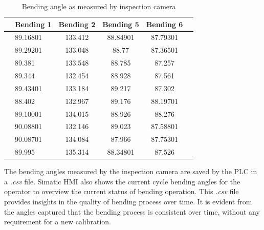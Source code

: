 \begin{table}[ht]
    \centering
    \small
    \renewcommand{\arraystretch}{1.2} %
    \begin{tabular}{llcccc}
        & \textbf{Bending 1} & \textbf{Bending 2} & \textbf{Bending 5} & \textbf{Bending 6} \\
        \hline
        & 89.16801 & 133.412 & 88.84901 & 87.79301 \\
        & 89.29201 & 133.048 & 88.77    & 87.36501 \\
        & 89.381   & 133.548 & 88.785   & 87.257   \\
        & 89.344   & 132.454 & 88.928   & 87.561   \\
        & 89.43401 & 133.184 & 89.217   & 87.302   \\
        & 88.402   & 132.967 & 89.176   & 88.19701 \\
        & 89.10001 & 134.015 & 88.926   & 88.276   \\
        & 90.08801 & 132.146 & 89.023   & 87.58801 \\
        & 90.08701 & 134.084 & 87.966   & 87.75301 \\
        & 89.995   & 135.314 & 88.34801 & 87.526   \\
        \hline
    \end{tabular}
    \caption{Bending angle as measured by inspection camera}
    \label{tab:bending-data}
\end{table}

The bending angles measured by the inspection camera are saved by the PLC in a \textit{.csv} file. Simatic HMI also shows the current cycle bending angles for the operator to overview the current status of bending operation. This \textit{.csv} file provides insights in the quality of bending process over time. It is evident from the angles captured that the bending process is consistent over time, without any requirement for a new calibration.